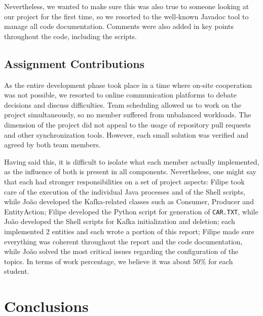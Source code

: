 \documentclass[12pt]{article}
\begin{document}
Nevertheless, we wanted to make sure this was also true to someone looking at our project for the first time, so we resorted to the well-known Javadoc
\cite{javadoc} tool to manage all code documentation.
Comments were also added in key points throughout the code, including the scripts.

\subsection{Assignment Contributions} \label{contributions} %

As the entire development phase took place in a time where on-site cooperation was not possible, we resorted to online communication platforms to debate decisions
and discuss difficulties.
Team scheduling allowed us to work on the project simultaneously, so no member suffered from unbalanced workloads.
The dimension of the project did not appeal to the usage of repository pull requests and other synchronization tools.
However, each small solution was verified and agreed by both team members.

Having said this, it is difficult to isolate what each member actually implemented, as the influence of both is present in all components.
Nevertheless, one might say that each had stronger responsibilities on a set of project aspects:
Filipe took care of the execution of the individual Java processes and of the Shell scripts, while João developed the Kafka-related classes such as Consumer,
Producer and EntityAction; Filipe developed the Python script for generation of \texttt{CAR.TXT}, while João developed the Shell scripts for Kafka initialization
and deletion; each implemented 2 entities and each wrote a portion of this report; Filipe made sure everything was coherent throughout the report and the code
documentation, while João solved the most critical issues regarding the configuration of the topics.
In terms of work percentage, we believe it was about 50\% for each student.

\newpage
\section*{Conclusions} \label{conclusions} %
\end{document}
